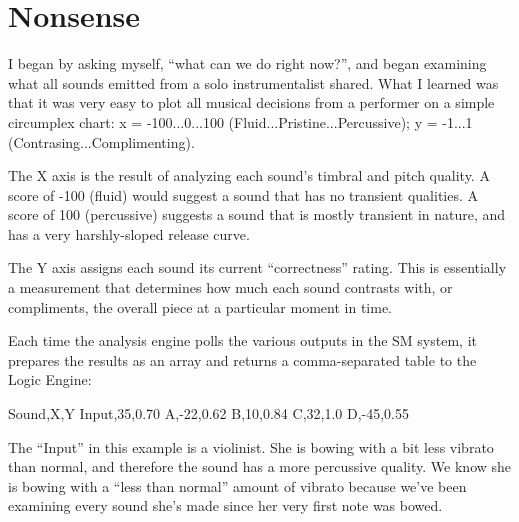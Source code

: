 \documentclass[12pt,twoside]{article}
\begin{document}
\section{Nonsense}

I began by asking myself, ``what can we do right now?'', and began examining what all sounds emitted from a solo instrumentalist shared. What I learned was that it was very easy to plot all musical decisions from a performer on a simple circumplex chart: x = -100...0...100 (Fluid...Pristine...Percussive); y = -1...1 (Contrasing...Complimenting).

The X axis is the result of analyzing each sound's timbral and pitch quality. A score of -100 (fluid) would suggest a sound that has no transient qualities. A score of 100 (percussive) suggests a sound that is mostly transient in nature, and has a very harshly-sloped release curve.

The Y axis assigns each sound its current ``correctness'' rating. This is essentially a measurement that determines how much each sound contrasts with, or compliments, the overall piece at a particular moment in time.

Each time the analysis engine polls the various outputs in the SM system, it prepares the results as an array and returns a comma-separated table to the Logic Engine:

Sound,X,Y
Input,35,0.70
A,-22,0.62
B,10,0.84
C,32,1.0
D,-45,0.55

The ``Input'' in this example is a violinist. She is bowing with a bit less vibrato than normal, and therefore the sound has a more percussive quality. We know she is bowing with a ``less than normal'' amount of vibrato because we've been examining every sound she's made since her very first note was bowed.


{\small
%
}
\end{document}
